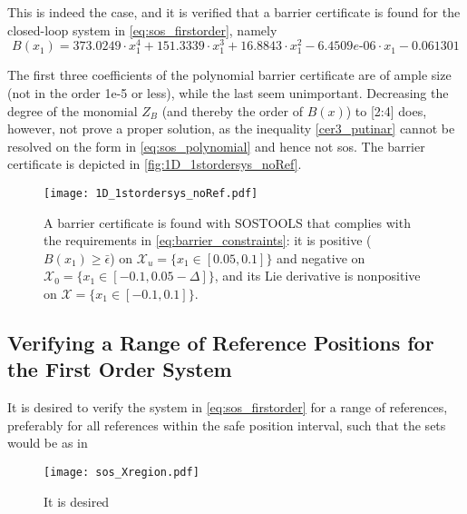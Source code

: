 \vspace{-2mm}
This is indeed the case, and it is verified that a barrier certificate is found for the closed-loop system in \autoref{eq:sos_firstorder}, namely
\vspace{-2mm}
\begin{equation}
B(x_1) = 373.0249\cdot x_1^4 + 151.3339\cdot x_1^3 + 16.8843\cdot x_1^2 - 6.4509e\text{-}06\cdot x_1 - 0.061301
\end{equation}

\vspace{-3mm}
The first three coefficients of the polynomial barrier certificate are of ample size (not in the order 1e-5 or less), while the last seem unimportant. Decreasing the degree of the monomial $Z_B$ (and thereby the order of $B(x)$) to [2:4] does, however, not prove a proper solution, as the inequality \autoref{cer3_putinar} cannot be resolved on the form in \autoref{eq:sos_polynomial} and hence not \gls{sos}. The  barrier certificate is depicted in \autoref{fig:1D_1stordersys_noRef}.

\begin{figure}[htbp]
\centering%
\texttt{[image: 1D\_1stordersys\_noRef.pdf]}
	\caption{A barrier certificate is found with SOSTOOLS that complies with the requirements in \autoref{eq:barrier_constraints}: it is positive ($B(x_1)\geq \bar{\epsilon}$) on $\mathcal{X}_u=\{x_1\in [0.05,0.1]\}$ and negative on $\mathcal{X}_0=\{x_1\in [-0.1,0.05-\Delta]\}$, and its Lie derivative is nonpositive on $\mathcal{X}=\{x_1\in [-0.1,0.1]\}$.}
	\label{fig:1D_1stordersys_noRef}
\end{figure}












\subsection{Verifying a Range of Reference Positions for the First Order System}

It is desired to verify the system in \autoref{eq:sos_firstorder} for a range of references, preferably for all references within the safe position interval, such that the sets would be as in 

\begin{figure}[htbp]
\centering
\texttt{[image: sos\_Xregion.pdf]}
\caption{It is desired}
\label{fig:sos_Xregion}
\end{figure}


